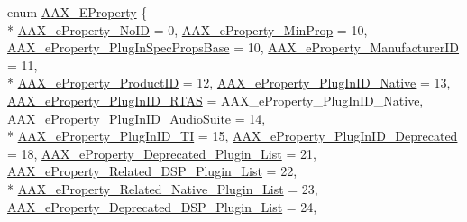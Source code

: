 \begin{DoxyCompactItemize}
\item 
enum \hyperlink{a00283_a6571f4e41a5dd06e4067249228e2249e}{A\+A\+X\+\_\+\+E\+Property} \{ \\*
\hyperlink{a00283_a6571f4e41a5dd06e4067249228e2249eae7fa114fff46bd05e6d64e17335b3abe}{A\+A\+X\+\_\+e\+Property\+\_\+\+No\+I\+D} = 0, 
\hyperlink{a00283_a6571f4e41a5dd06e4067249228e2249ead7a9d36a94cfd0799ee434484b05880a}{A\+A\+X\+\_\+e\+Property\+\_\+\+Min\+Prop} = 10, 
\hyperlink{a00283_a6571f4e41a5dd06e4067249228e2249eadc0be12e13a5dcdf799f3405b9da27c9}{A\+A\+X\+\_\+e\+Property\+\_\+\+Plug\+In\+Spec\+Props\+Base} = 10, 
\hyperlink{a00283_a6571f4e41a5dd06e4067249228e2249ea996465cca29a2a15291d1c788ac5728c}{A\+A\+X\+\_\+e\+Property\+\_\+\+Manufacturer\+I\+D} = 11, 
\\*
\hyperlink{a00283_a6571f4e41a5dd06e4067249228e2249ea3a41fcdff5af1a4fd19dcbca7b1ba6f3}{A\+A\+X\+\_\+e\+Property\+\_\+\+Product\+I\+D} = 12, 
\hyperlink{a00283_a6571f4e41a5dd06e4067249228e2249ea89ca3dd6e96895cda14976c1b1ceb826}{A\+A\+X\+\_\+e\+Property\+\_\+\+Plug\+In\+I\+D\+\_\+\+Native} = 13, 
\hyperlink{a00283_a6571f4e41a5dd06e4067249228e2249ea01880753b83fc0a40d99a5381301a9cf}{A\+A\+X\+\_\+e\+Property\+\_\+\+Plug\+In\+I\+D\+\_\+\+R\+T\+A\+S} = A\+A\+X\+\_\+e\+Property\+\_\+\+Plug\+In\+I\+D\+\_\+\+Native, 
\hyperlink{a00283_a6571f4e41a5dd06e4067249228e2249ead3344696b8298a8b254add3d039ea927}{A\+A\+X\+\_\+e\+Property\+\_\+\+Plug\+In\+I\+D\+\_\+\+Audio\+Suite} = 14, 
\\*
\hyperlink{a00283_a6571f4e41a5dd06e4067249228e2249ea75f174df4efbeca86eaada126c1d9214}{A\+A\+X\+\_\+e\+Property\+\_\+\+Plug\+In\+I\+D\+\_\+\+T\+I} = 15, 
\hyperlink{a00283_a6571f4e41a5dd06e4067249228e2249eadb254df9b6114516beed7a04675a22a3}{A\+A\+X\+\_\+e\+Property\+\_\+\+Plug\+In\+I\+D\+\_\+\+Deprecated} = 18, 
\hyperlink{a00283_a6571f4e41a5dd06e4067249228e2249ea2414ef0c66df40f47ec8f8092de3b94a}{A\+A\+X\+\_\+e\+Property\+\_\+\+Deprecated\+\_\+\+Plugin\+\_\+\+List} = 21, 
\hyperlink{a00283_a6571f4e41a5dd06e4067249228e2249ea9dc35184d705e963f14f85df4d71193d}{A\+A\+X\+\_\+e\+Property\+\_\+\+Related\+\_\+\+D\+S\+P\+\_\+\+Plugin\+\_\+\+List} = 22, 
\\*
\hyperlink{a00283_a6571f4e41a5dd06e4067249228e2249eae47f50370ae2f6bf29b8cacc6a41d924}{A\+A\+X\+\_\+e\+Property\+\_\+\+Related\+\_\+\+Native\+\_\+\+Plugin\+\_\+\+List} = 23, 
\hyperlink{a00283_a6571f4e41a5dd06e4067249228e2249eab102bc794f2770c14b1f0fe2dde6766a}{A\+A\+X\+\_\+e\+Property\+\_\+\+Deprecated\+\_\+\+D\+S\+P\+\_\+\+Plugin\+\_\+\+List} = 24, 

\end{DoxyCompactItemize}
